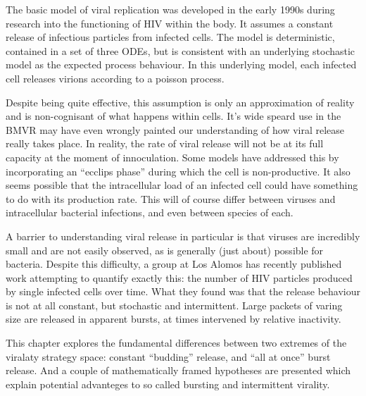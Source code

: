





The basic model of viral replication was developed in the early 1990s during research into the functioning of HIV within the body. It assumes a constant release of infectious particles from infected cells. The model is deterministic, contained in a set of three ODEs, but is consistent with an underlying stochastic model as the expected process behaviour. In this underlying model, each infected cell releases virions according to a poisson process.\par 

Despite being quite effective, this assumption is only an approximation of reality and is non-cognisant of what happens within cells. It's wide speard use in the BMVR may have even wrongly painted our understanding of how viral release really takes place. In reality, the rate of viral release will not be at its full capacity at the moment of innoculation. Some models have addressed this by incorporating an ``ecclips phase'' during which the cell is non-productive. It also seems possible that the intracellular load of an infected cell could have something to do with its production rate. This will of course differ between viruses and intracellular bacterial infections, and even between species of each.  \par
A barrier to understanding viral release in particular is that viruses are incredibly small and are not easily observed, as is generally  (just about)  possible for bacteria. Despite this difficulty, a group at Los Alomos has recently published work attempting to quantify exactly this: the number of HIV particles produced by single infected cells over time. What they found was that the release behaviour is not at all constant, but stochastic and intermittent. Large packets of varing size are released in apparent bursts, at times intervened by relative inactivity.\par
This chapter explores the fundamental differences between two extremes of the viralaty strategy space: constant ``budding'' release, and ``all at once'' burst release. And a couple of mathematically framed hypotheses are presented which explain potential advanteges to so called bursting and intermittent virality.


